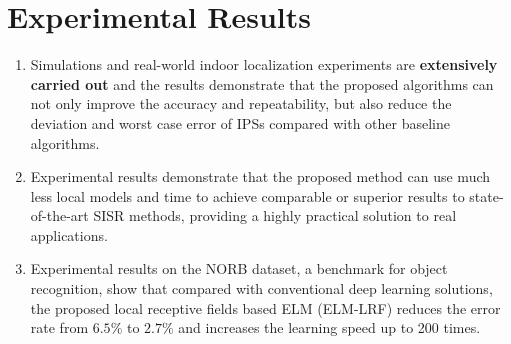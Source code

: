 \documentclass[onecolumn,conference]{IEEEtran}
\begin{document}
\section{Experimental Results}
\begin{enumerate}
\item Simulations and real-world indoor localization experiments are \textbf{extensively carried out} and the results demonstrate that the proposed algorithms can not only improve the accuracy and repeatability, but also reduce the deviation and worst case error of IPSs compared with other baseline algorithms. \cite{Lu2016}
\item Experimental results demonstrate that the proposed method can use much less local models and time to achieve comparable or superior results to state-of-the-art SISR methods, providing a highly practical solution to real applications. \cite{Zhang2016}
\item Experimental results on the NORB dataset, a benchmark for object recognition, show that compared with conventional deep learning solutions, the proposed local receptive fields based ELM (ELM-LRF) reduces the error rate from $6.5\%$ to $2.7\%$ and increases the learning speed up to 200 times.\cite{Huang2015}
\end{enumerate}


\end{document}

